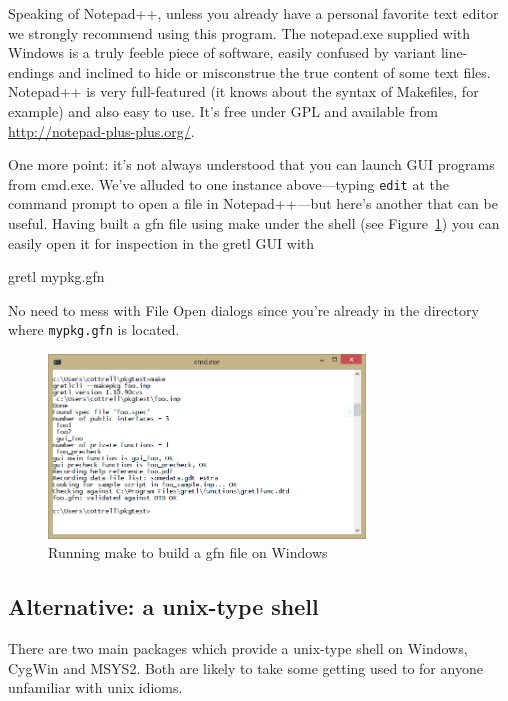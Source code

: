 \documentclass[oneside]{book}
\begin{document}
Speaking of \textsf{Notepad++}, unless you already have a personal
favorite text editor we strongly recommend using this program. The
\textsf{notepad.exe} supplied with Windows is a truly feeble piece of
software, easily confused by variant line-endings and inclined to hide
or misconstrue the true content of some text files. \textsf{Notepad++}
is very full-featured (it knows about the syntax of Makefiles, for
example) and also easy to use. It's free under GPL and available from
\url{http://notepad-plus-plus.org/}.

One more point: it's not always understood that you can launch GUI
programs from \textsf{cmd.exe}. We've alluded to one instance
above---typing \texttt{edit} at the command prompt to open a file in
\textsf{Notepad++}---but here's another that can be useful. Having
built a \textsf{gfn} file using \textsf{make} under the shell (see
Figure~\ref{fig:cmd-exe}) you can easily open it for inspection in the
gretl GUI with
%
\begin{code}
gretl mypkg.gfn
\end{code}
%
No need to mess with File Open dialogs since you're already in the
directory where \texttt{mypkg.gfn} is located.

\begin{figure}[htbp]
  \centering
  \includegraphics[width=0.75\textwidth]{figures/cmd-exe}
  \caption{Running make to build a gfn file on Windows}
  \label{fig:cmd-exe}
\end{figure}

\subsection*{Alternative: a unix-type shell}

There are two main packages which provide a unix-type shell on
Windows, \textsf{CygWin} and \textsf{MSYS2}. Both are likely to take
some getting used to for anyone unfamiliar with unix idioms.
\end{document}
